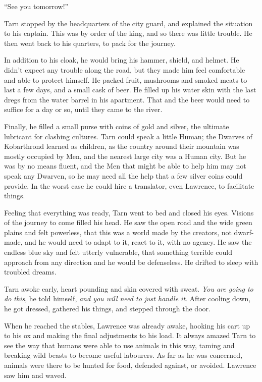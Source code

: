 ``See you tomorrow!''

Tarn stopped by the headquarters of the city guard, and explained the situation to his captain.  This was by order of the king, and so there was little trouble.  He then went back to his quarters, to pack for the journey.

In addition to his cloak, he would bring his hammer, shield, and helmet.  He didn't expect any trouble along the road, but they made him feel comfortable and able to protect himself.  He packed fruit, mushrooms and smoked meats to last a few days, and a small cask of beer.  He filled up his water skin with the last dregs from the water barrel in his apartment.  That and the beer would need to suffice for a day or so, until they came to the river.

Finally, he filled a small purse with coins of gold and silver, the ultimate lubricant for clashing cultures.  Tarn could speak a little Human; the Dwarves of Kobarthrond learned as children, as the country around their mountain was mostly occupied by Men, and the nearest large city was a Human city.  But he was by no means fluent, and the Men that might be able to help him may not speak any Dwarven, so he may need all the help that a few silver coins could provide.  In the worst case he could hire a translator, even Lawrence, to facilitate things.

Feeling that everything was ready, Tarn went to bed and closed his eyes.  Visions of the journey to come filled his head.  He saw the open road and the wide green plains and felt powerless, that this was a world made by the creators, not dwarf-made, and he would need to adapt to it, react to it, with no agency.  He saw the endless blue sky and felt utterly vulnerable, that something terrible could approach from any direction and he would be defenseless.  He drifted to sleep with troubled dreams.

Tarn awoke early, heart pounding and skin covered with sweat.  \emph{You are going to do this}, he told himself, \emph{and you will need to just handle it}.  After cooling down, he got dressed, gathered his things, and stepped through the door.

When he reached the stables, Lawrence was already awake, hooking his cart up to his ox and making the final adjustments to his load.  It always amazed Tarn to see the way that humans were able to use animals in this way, taming and breaking wild beasts to become useful labourers.  As far as he was concerned, animals were there to be hunted for food, defended against, or avoided.  Lawrence saw him and waved.

